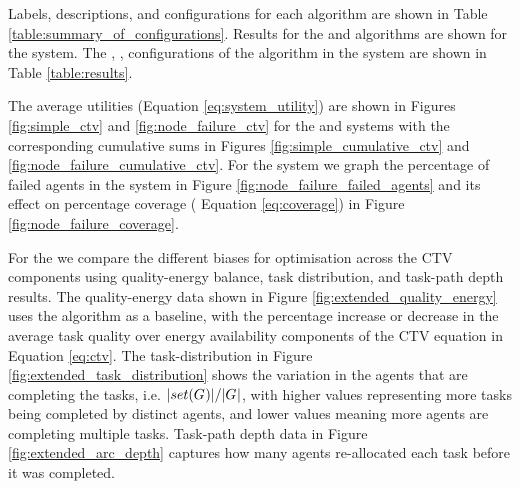 
Labels, descriptions, and configurations for each algorithm are shown in Table \ref{table:summary_of_configurations}. Results for the \algorithmBalanced{}{} and \algorithmBaseline{}{} algorithms are shown for the \simulationSimple{}{} system. The \algorithmEnergy{}{}, \algorithmQuality{}{}, \algorithmDistribution{}{} configurations of the \acronymWSNOptimisation{}{} algorithm in the \simulationExtended{}{} system are shown in Table \ref{table:results}. 

The average utilities  (Equation \ref{eq:system_utility}) are shown in Figures \ref{fig:simple_ctv} and \ref{fig:node_failure_ctv} for the \simulationSimple{}{} and \simulationNodeFailure{}{} systems with the corresponding cumulative sums in Figures \ref{fig:simple_cumulative_ctv} and \ref{fig:node_failure_cumulative_ctv}. For the \simulationNodeFailure{}{} system we graph the percentage of failed agents in the system in Figure \ref{fig:node_failure_failed_agents} and its effect on percentage coverage (	Equation \ref{eq:coverage}) in Figure \ref{fig:node_failure_coverage}. 

For the \simulationExtended{}{} we compare the different biases for optimisation across the CTV components using quality-energy balance, task distribution, and task-path depth results. The quality-energy data shown in Figure \ref{fig:extended_quality_energy} uses the \algorithmEnergy{}{} algorithm as a baseline, with the percentage increase or decrease in the average task quality over energy availability components of the CTV equation in Equation \ref{eq:ctv}. The task-distribution in Figure \ref{fig:extended_task_distribution} shows the variation in the agents that are completing the tasks, i.e. $\lvert set(G_{}^{}) \rvert{}/\lvert G_{}^{} \rvert{}$, with higher values representing more tasks being completed by distinct agents, and lower values meaning more agents are completing multiple tasks. Task-path depth data in Figure \ref{fig:extended_arc_depth} captures how many agents re-allocated each task before it was completed.